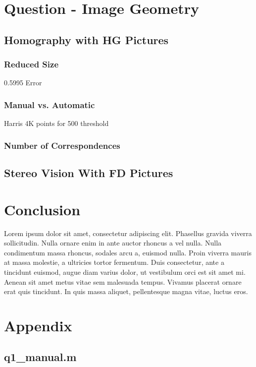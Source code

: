 \documentclass[a4paper, 10pt, conference]{ieeeconf}
\begin{document}
\section{Question - Image Geometry}
\subsection{Homography with HG Pictures}
\subsubsection{Reduced Size}
0.5995 Error
\subsubsection{Manual vs. Automatic}
Harris 4K points for 500 threshold
\subsubsection{Number of Correspondences}

\subsection{Stereo Vision With FD Pictures}


\cite{notes}


\section{Conclusion}
Lorem ipsum dolor sit amet, consectetur adipiscing elit. Phasellus gravida viverra sollicitudin. Nulla ornare enim in ante auctor rhoncus a vel nulla. Nulla condimentum massa rhoncus, sodales arcu a, euismod nulla. Proin viverra mauris at massa molestie, a ultricies tortor fermentum. Duis consectetur, ante a tincidunt euismod, augue diam varius dolor, ut vestibulum orci est sit amet mi. Aenean sit amet metus vitae sem malesuada tempus. Vivamus placerat ornare erat quis tincidunt. In quis massa aliquet, pellentesque magna vitae, luctus eros.




\onecolumn
\section*{Appendix}

\subsection*{q1\_manual.m}

\newpage
\end{document}
